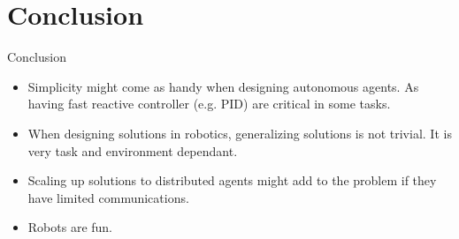 \documentclass[10pt]{beamer}
\begin{document}
\section{Conclusion}

\begin{frame}{Conclusion}
\begin{itemize}
    \item Simplicity might come as handy when designing autonomous agents. As having fast reactive controller (e.g. PID) are critical in some tasks.
    \item When designing solutions in robotics, generalizing solutions is not trivial. It is very task and environment dependant.
    \item Scaling up solutions to distributed agents might add to the problem if they have limited communications.
    \item Robots are fun.

\end{itemize}
\end{frame}
\end{document}
